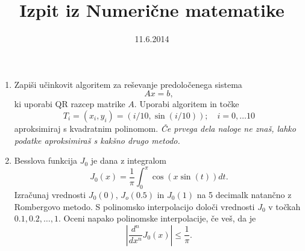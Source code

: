 \documentclass[slovene]{article}
\begin{document}
\title{Izpit iz Numerične matematike}


\date{11.6.2014}
\maketitle
\begin{enumerate}
\item Zapiši učinkovit algoritem za reševanje predoločenega sistema 
$$Ax=b,$$
ki uporabi QR razcep matrike $A$. Uporabi algoritem in točke
\begin{equation*}
T_i=(x_i,y_i)=(i/10,\sin(i/10));\quad i=0,\ldots 10
\end{equation*}
aproksimiraj s kvadratnim polinomom. \emph{Če prvega dela naloge ne znaš, lahko 
podatke aproksimiraš s kakšno drugo metodo.}    

\item Besslova funkcija $J_0$ je dana z integralom 
  \begin{equation}
    J_0(x)=\frac{1}{\pi}\int_0^\pi \cos(x\sin(t))dt.
  \end{equation}
Izračunaj vrednosti $J_0(0)$, $J_o(0.5)$ in $J_0(1)$ na 
5 decimalk natančno z Rombergovo metodo. S polinomsko interpolacijo določi 
vrednosti $J_0$ v točkah  $0.1,0.2,\ldots,1$. Oceni napako polinomske 
interpolacije, če veš, da je 
$$|\frac{d^n}{dx^n}J_0(x)|\le \frac{1}{\pi}.$$  
 \end{enumerate}
\end{document}
